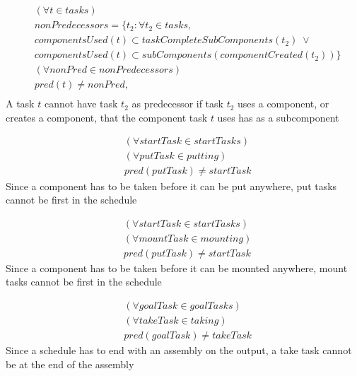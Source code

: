 \documentclass[10pt,a4paper]{report}
\begin{document}
\begin{equation}
\begin{aligned}\label{eq:78}
&(\forall t \in tasks)\\
&nonPredecessors = \{t_2 : \forall t_2 \in tasks, \\
&componentsUsed(t) \subset taskCompleteSubComponents(t_2) \; \lor \\
&componentsUsed(t) \subset subComponents(componentCreated(t_2))\} \\
&(\forall nonPred \in nonPredecessors) \\
&pred(t) \neq nonPred, \\
\end{aligned}
\end{equation}
A task $t$ cannot have task $t_2$ as predecessor if task $t_2$ uses a component, or creates a component, that the component task $t$ uses has as a subcomponent

\begin{equation}\label{eq:79}
\begin{aligned}
&(\forall startTask \in startTasks)\\
&(\forall putTask \in putting)\\
&pred(putTask) \neq startTask
\end{aligned}
\end{equation}
Since a component has to be taken before it can be put anywhere, put tasks cannot be first in the schedule

\begin{equation}\label{eq:80}
\begin{aligned}
&(\forall startTask \in startTasks)\\
&(\forall mountTask \in mounting)\\
&pred(putTask) \neq startTask 
\end{aligned}
\end{equation}
Since a component has to be taken before it can be mounted anywhere, mount tasks cannot be first in the schedule

\begin{equation}\label{eq:81}
\begin{aligned}
&(\forall goalTask \in goalTasks) \\
&(\forall takeTask \in taking) \\
&pred(goalTask) \neq takeTask
\end{aligned}
\end{equation}
Since a schedule has to end with an assembly on the output, a take task cannot be at the end of the assembly
\end{document}
